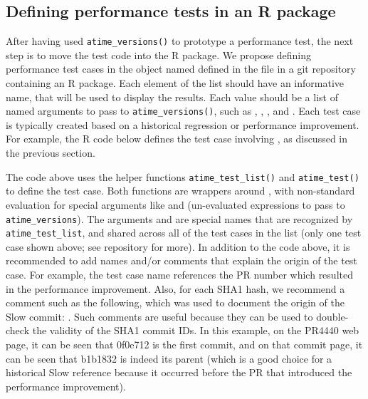 \subsection{Defining performance tests in an R package}
After having used \verb|atime_versions()| to prototype a performance test, the next step is to move the test code into the R package. 
We propose defining performance test cases in the object named  defined in the  file in a git repository  containing an R package.
Each element of the list should have an informative name, that will be used to display the results.
Each value should be a list of named arguments to pass to \verb|atime_versions()|, such as , , , and  .
Each test case is typically created based on a historical regression or performance improvement. 
For example, the R code below defines the test case involving , as discussed in the previous section.
\begin{Schunk}
\end{Schunk}
The code above uses the helper functions \verb|atime_test_list()| and \verb|atime_test()| to define the test case.
Both functions are wrappers around , with non-standard evaluation for special arguments like  and  (un-evaluated expressions to pass to \verb|atime_versions|). 
The arguments  and  are special names that are recognized by \verb|atime_test_list|, and shared across all of the test cases in the list (only one test case shown above; see  repository for more).
In addition to the code above, it is recommended to add names and/or comments that explain the origin of the test case.
For example, the test case name  references the PR number which resulted in the performance improvement.
Also, for each SHA1 hash, we recommend a comment such as the following, which was used to document the origin of the Slow commit:
.
Such comments are useful because they can be used to double-check the validity of the SHA1 commit IDs.
In this example, on the PR4440 web page, it can be seen that 0f0e712 is the first commit, and on that commit page, it can be seen that b1b1832 is indeed its parent (which is a good choice for a historical Slow reference because it occurred before the PR that introduced the performance improvement).


